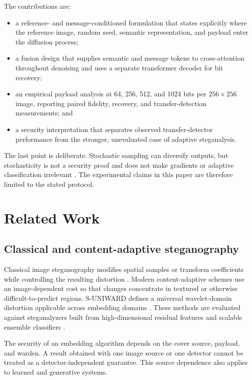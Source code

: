 \documentclass[pdflatex,sn-mathphys-num]{sn-jnl}
\begin{document}
The contributions are:

\begin{itemize}
\item a reference- and message-conditioned formulation that states explicitly where the reference image, random seed, semantic representation, and payload enter the diffusion process;
\item a fusion design that supplies semantic and message tokens to cross-attention throughout denoising and uses a separate transformer decoder for bit recovery;
\item an empirical payload analysis at 64, 256, 512, and 1024 bits per $256\times256$ image, reporting paired fidelity, recovery, and transfer-detection measurements; and
\item a security interpretation that separates observed transfer-detector performance from the stronger, unevaluated case of adaptive steganalysis.
\end{itemize}

The last point is deliberate. Stochastic sampling can diversify outputs, but stochasticity is not a security proof and does not make gradients or adaptive classification irrelevant \cite{athalye2018obfuscated}. The experimental claims in this paper are therefore limited to the stated protocol.

\section{Related Work}
\label{sec:related}

\subsection{Classical and content-adaptive steganography}

Classical image steganography modifies spatial samples or transform coefficients while controlling the resulting distortion \cite{cox2007digital,fridrich2009steganography}. Modern content-adaptive schemes use an image-dependent cost so that changes concentrate in textured or otherwise difficult-to-predict regions. S-UNIWARD defines a universal wavelet-domain distortion applicable across embedding domains \cite{holub2014universal}. These methods are evaluated against steganalyzers built from high-dimensional residual features and scalable ensemble classifiers \cite{fridrich2012rich,kodovsky2012ensemble}.

The security of an embedding algorithm depends on the cover source, payload, and warden. A result obtained with one image source or one detector cannot be treated as a detector-independent guarantee. This source dependence also applies to learned and generative systems.
\end{document}
